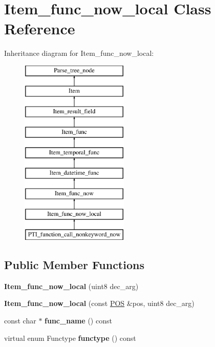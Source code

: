\hypertarget{classItem__func__now__local}{}\section{Item\+\_\+func\+\_\+now\+\_\+local Class Reference}
\label{classItem__func__now__local}
Inheritance diagram for Item\+\_\+func\+\_\+now\+\_\+local\+:\begin{figure}[H]
\begin{center}
\leavevmode
\includegraphics[height=9.000000cm]{classItem__func__now__local}
\end{center}
\end{figure}
\subsection*{Public Member Functions}
\begin{DoxyCompactItemize}
\item 
\mbox{\label{classItem__func__now__local_ab5e69e17e85f5db9ce16824b441cd627}} 
{\bfseries Item\+\_\+func\+\_\+now\+\_\+local} (uint8 dec\+\_\+arg)
\item 
\mbox{\label{classItem__func__now__local_a7ba5e9d1d7b4caa9076f121f080da465}} 
{\bfseries Item\+\_\+func\+\_\+now\+\_\+local} (const \mbox{\hyperlink{structYYLTYPE}{P\+OS}} \&pos, uint8 dec\+\_\+arg)
\item 
\mbox{\label{classItem__func__now__local_ac00b8d296d0dc875b263f370d54efa9b}} 
const char $\ast$ {\bfseries func\+\_\+name} () const
\item 
\mbox{\label{classItem__func__now__local_a49168ef5e70f81b9f0ca6fd0fd4a56fe}} 
virtual enum Functype {\bfseries functype} () const
\end{DoxyCompactItemize}
